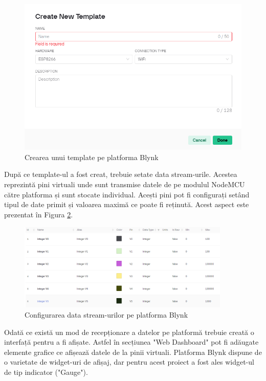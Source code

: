 \begin{figure}[H]
\includegraphics[width=0.7\linewidth]{bachelors_ro/images/blynk_template.png}
\caption{Crearea unui template pe platforma Blynk \cite{templ_blynk}}
\label{fig:template_blynk}
\end{figure}

După ce template-ul a fost creat, trebuie setate data stream-urile. Acestea reprezintă pini virtuali unde sunt transmise datele de pe modulul NodeMCU către platforma și sunt stocate individual. Acești pini pot fi configurați setând tipul de date primit și valoarea maximă ce poate fi reținută. Acest aspect este prezentat în Figura \ref{fig:data_stream_blynk}.

\begin{figure}[H]
\includegraphics[width=0.9\textwidth, height=0.4\textwidth]{bachelors_ro/images/data_streams_blynk.png}
\caption{Configurarea data stream-urilor pe platforma Blynk \cite{templ_blynk}}
\label{fig:data_stream_blynk}
\end{figure}

Odată ce există un mod de recepționare a datelor pe platformă trebuie creată o interfață pentru a fi afișate. Astfel în secțiunea "Web Dashboard" pot fi adăugate elemente grafice ce afișează datele de la pinii virtuali. Platforma Blynk dispune de o varietate de widget-uri de afișaj, dar pentru acest proiect a fost ales widget-ul de tip indicator ("Gauge").


